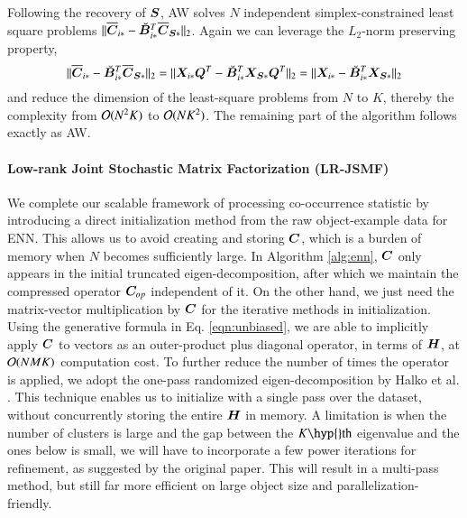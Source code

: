 Following the recovery of $\bm{S}$, AW solves $N$ independent simplex-constrained
least square problems $\|\overline{\bm{C}}_{i\ast} - \smash{\breve{\bm{B}}}_{i\ast}^T\overline{\bm{C}}_
{\bm{S}\ast}\|_2$. Again we can leverage the $L_2$-norm preserving property, 
\begin{equation}\label{eqn:lrls}
  \|\overline{\bm{C}}_{i\ast} - \smash{\breve{\bm{B}}}_{i\ast}^T\overline{\bm{C}}_{\bm{S}\ast}\|_2 = \|\bm{X}_{i\ast}\bm{Q}^T
  - \smash{\breve{\bm{B}}}_{i\ast}^T\bm{X}_{\bm{S}\ast}\bm{Q}^T\|_2 = \|\bm{X}_{i\ast} - \smash{\breve{\bm{B}}}_{i\ast}^T 
  \bm{X}_{\bm{S}\ast}\|_2
\end{equation}
and reduce the dimension of the least\hyp{}square problems from $N$ to $K$,
thereby the complexity from $\mathcal{O}(N^2K)$ to $\mathcal{O}(NK^2)$. The remaining part
of the algorithm follows exactly as AW.

\paragraph{Low\hyp{}rank Joint Stochastic Matrix Factorization (LR-JSMF)} 
We complete our scalable framework of processing co\hyp{}occurrence statistic by
introducing a direct initialization method from the raw object-example data for
ENN. This allows us to avoid creating and storing $\bm{C}$, which is a burden of
memory when $N$ becomes sufficiently large. In Algorithm \ref{alg:enn}, $\bm{C}$
only appears in the initial truncated eigen\hyp{}decomposition, after which we
maintain the compressed operator $\bm{C}_{op}$ independent of it. On the other
hand, we just need the matrix\hyp{}vector multiplication by $\bm{C}$ for the
iterative methods in initialization. Using the generative formula in Eq. 
\ref{eqn:unbiased}, we are able to implicitly apply $\bm{C}$ to vectors as an
outer\hyp{}product plus diagonal operator, in terms of $\bm{H}$, at $\mathcal{O}(NMK)$
computation cost. To further reduce the number of times the operator is applied,
we adopt the one-pass randomized eigen\hyp{}decomposition by Halko et al. 
\cite{halko2011finding}. This technique enables us to initialize with a single
pass over the dataset, without concurrently storing the entire $\bm{H}$ in memory.
A limitation is when the number of clusters is large and the gap between the
$K\mathrm{\hyp{}th}$ eigenvalue and the ones below is small, we will have to
incorporate a few power iterations for refinement, as suggested by the original
paper. This will result in a multi\hyp{}pass method, but still far more
efficient on large object size and parallelization-friendly.